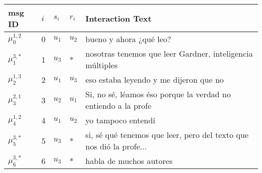 {
\setlength\tabcolsep{4pt}
\begin{tabularx}{0.63\textwidth}{llllX}
\toprule
msg ID & $i$ & $s_i$ & $r_i$ & Interaction Text\\
\midrule
$\mu_0^{1,2} $  &0& $u_1$ & $u_2$ & bueno y ahora ¿qué leo? \\
$\mu_1^{3,*} $  &1& $u_3$ & * & nosotras tenemos que leer Gardner, inteligencia múltiples  \\
$\mu_2^{1,3} $  &2& $u_1$ & $u_3$  & eso estaba leyendo y me dijeron que no  \\
$\mu_3^{2,1} $  &3& $u_2$ & $u_1$ & Si, no sé, léamos éso porque la verdad no entiendo a la profe \\
$\mu_4^{1,2} $  &4& $u_1$ & $u_2$ & yo tampoco entendí  \\
$\mu_5^{3,*} $  &5& $u_3$ & * & si,  sé qué tenemos que leer, pero del texto que nos dió la profe...\\ 
$\mu_6^{3,*} $  &6& $u_3$ & * & habla de muchos autores  \\  
\bottomrule
\end{tabularx}
}